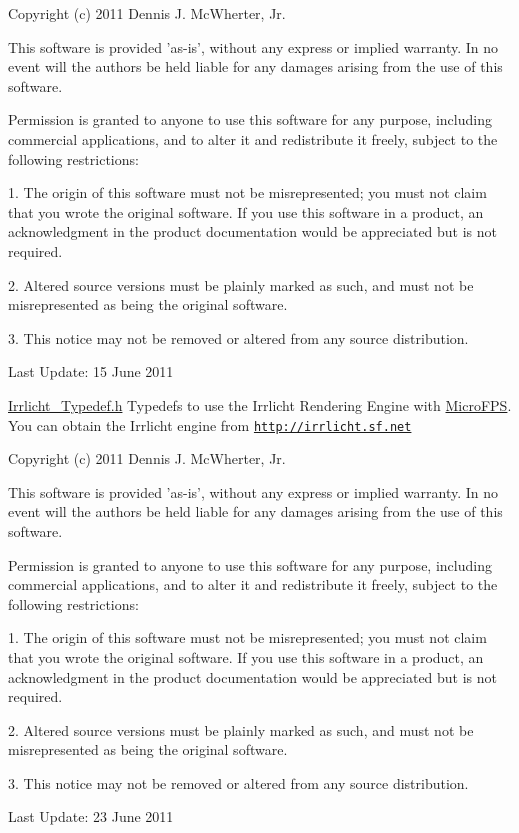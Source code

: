 Copyright (c) 2011 Dennis J. McWherter, Jr.

This software is provided 'as-\/is', without any express or implied warranty. In no event will the authors be held liable for any damages arising from the use of this software.

Permission is granted to anyone to use this software for any purpose, including commercial applications, and to alter it and redistribute it freely, subject to the following restrictions:

1. The origin of this software must not be misrepresented; you must not claim that you wrote the original software. If you use this software in a product, an acknowledgment in the product documentation would be appreciated but is not required.

2. Altered source versions must be plainly marked as such, and must not be misrepresented as being the original software.

3. This notice may not be removed or altered from any source distribution.

Last Update: 15 June 2011

\hyperlink{_irrlicht___typedef_8h_source}{Irrlicht\_\-Typedef.h} Typedefs to use the Irrlicht Rendering Engine with \hyperlink{namespace_micro_f_p_s}{MicroFPS}. You can obtain the Irrlicht engine from \href{http://irrlicht.sf.net}{\tt http://irrlicht.sf.net}

Copyright (c) 2011 Dennis J. McWherter, Jr.

This software is provided 'as-\/is', without any express or implied warranty. In no event will the authors be held liable for any damages arising from the use of this software.

Permission is granted to anyone to use this software for any purpose, including commercial applications, and to alter it and redistribute it freely, subject to the following restrictions:

1. The origin of this software must not be misrepresented; you must not claim that you wrote the original software. If you use this software in a product, an acknowledgment in the product documentation would be appreciated but is not required.

2. Altered source versions must be plainly marked as such, and must not be misrepresented as being the original software.

3. This notice may not be removed or altered from any source distribution.

Last Update: 23 June 2011 